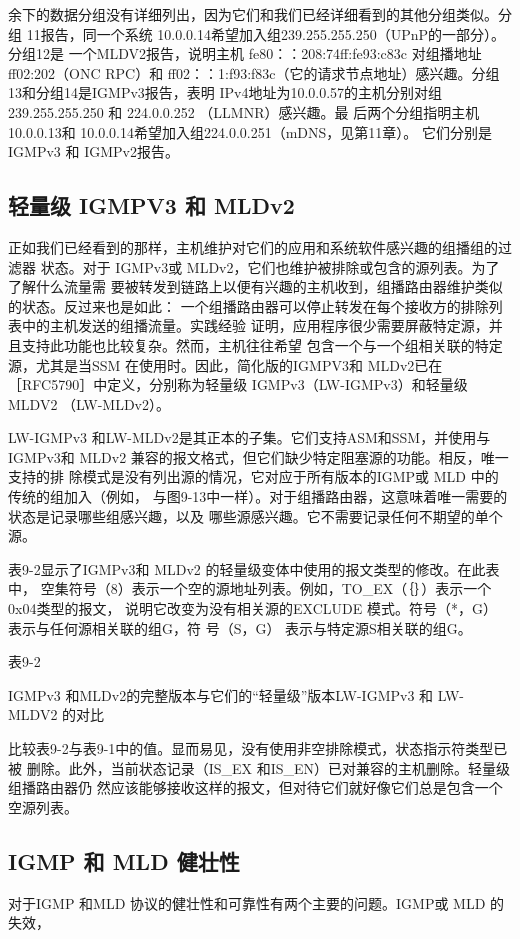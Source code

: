 余下的数据分组没有详细列出，因为它们和我们已经详细看到的其他分组类似。分组
11报告，同一个系统 10.0.0.14希望加入组239.255.255.250（UPnP的一部分）。分组12是
一个MLDV2报告，说明主机 fe80：：208:74ff:fe93:c83c 对组播地址 ff02:202（ONC RPC）和
ff02：：1:f93:f83c（它的请求节点地址）感兴趣。分组13和分组14是IGMPv3报告，表明
IPv4地址为10.0.0.57的主机分别对组239.255.255.250 和 224.0.0.252 （LLMNR）感兴趣。最
后两个分组指明主机 10.0.0.13和 10.0.0.14希望加入组224.0.0.251（mDNS，见第11章）。
它们分别是 IGMPv3 和 IGMPv2报告。

\subsection{轻量级 IGMPV3 和 MLDv2}
正如我们已经看到的那样，主机维护对它们的应用和系统软件感兴趣的组播组的过滤器
状态。对于 IGMPv3或 MLDv2，它们也维护被排除或包含的源列表。为了了解什么流量需
要被转发到链路上以便有兴趣的主机收到，组播路由器维护类似的状态。反过来也是如此：
一个组播路由器可以停止转发在每个接收方的排除列表中的主机发送的组播流量。实践经验
证明，应用程序很少需要屏蔽特定源，并且支持此功能也比较复杂。然而，主机往往希望
包含一个与一个组相关联的特定源，尤其是当SSM 在使用时。因此，简化版的IGMPV3和
MLDv2已在［RFC5790］中定义，分别称为轻量级 IGMPv3（LW-IGMPv3）和轻量级 MLDV2
（LW-MLDv2）。

LW-IGMPv3 和LW-MLDv2是其正本的子集。它们支持ASM和SSM，并使用与
IGMPv3和 MLDv2 兼容的报文格式，但它们缺少特定阻塞源的功能。相反，唯一支持的排
除模式是没有列出源的情况，它对应于所有版本的IGMP或 MLD 中的传统的组加入（例如，
与图9-13中一样）。对于组播路由器，这意味着唯一需要的状态是记录哪些组感兴趣，以及
哪些源感兴趣。它不需要记录任何不期望的单个源。

表9-2显示了IGMPv3和 MLDv2 的轻量级变体中使用的报文类型的修改。在此表中，
空集符号（8）表示一个空的源地址列表。例如，TO\_EX（｛｝）表示一个0x04类型的报文，
说明它改变为没有相关源的EXCLUDE 模式。符号（*，G） 表示与任何源相关联的组G，符
号（S，G） 表示与特定源S相关联的组G。

表9-2

IGMPv3 和MLDv2的完整版本与它们的“轻量级”版本LW-IGMPv3 和 LW-MLDV2 的对比


比较表9-2与表9-1中的值。显而易见，没有使用非空排除模式，状态指示符类型已被
删除。此外，当前状态记录（IS\_EX 和IS\_EN）已对兼容的主机删除。轻量级组播路由器仍
然应该能够接收这样的报文，但对待它们就好像它们总是包含一个空源列表。

\subsection{IGMP 和 MLD 健壮性}
对于IGMP 和MLD 协议的健壮性和可靠性有两个主要的问题。IGMP或 MLD 的失效，

